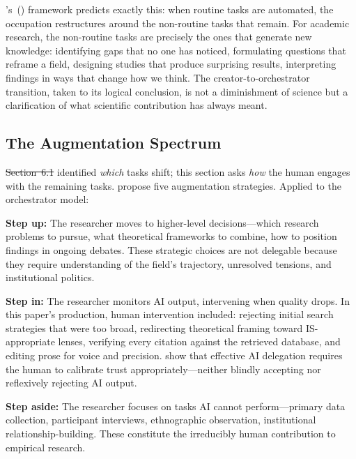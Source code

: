 \documentclass{article}
\providecommand{\DIFaddtex}[1]{{\protect\color{blue}\uwave{#1}}} %
\providecommand{\DIFdeltex}[1]{{\protect\color{red}\sout{#1}}}                      %
\providecommand{\DIFaddbegin}{} %
\providecommand{\DIFaddend}{} %
\providecommand{\DIFdelbegin}{} %
\providecommand{\DIFdelend}{} %
\providecommand{\DIFadd}[1]{\texorpdfstring{\DIFaddtex{#1}}{#1}} %
\providecommand{\DIFdel}[1]{\texorpdfstring{\DIFdeltex{#1}}{}} %
\newcommand{\DIFscaledelfig}{0.5}
\newlength{\DIFdelgraphicswidth} %
\newlength{\DIFdelgraphicsheight} %
\newcommand{\DIFaddincludegraphics}[2][]{{\color{blue}\fbox{\DIFOincludegraphics[#1]{#2}}}} %
\newcommand{\DIFdelincludegraphics}[2][]{%
\sbox{\DIFdelgraphicsbox}{\DIFOincludegraphics[#1]{#2}}%
\settoboxwidth{\DIFdelgraphicswidth}{\DIFdelgraphicsbox} %
\settoboxtotalheight{\DIFdelgraphicsheight}{\DIFdelgraphicsbox} %
\scalebox{\DIFscaledelfig}{%
\parbox[b]{\DIFdelgraphicswidth}{\usebox{\DIFdelgraphicsbox}\\[-\baselineskip] \rule{\DIFdelgraphicswidth}{0em}}\llap{\resizebox{\DIFdelgraphicswidth}{\DIFdelgraphicsheight}{%
\setlength{\unitlength}{\DIFdelgraphicswidth}%
\begin{picture}(1,1)%
\thicklines\linethickness{2pt} %
{\color[rgb]{1,0,0}\put(0,0){\framebox(1,1){}}}%
{\color[rgb]{1,0,0}\put(0,0){\line( 1,1){1}}}%
{\color[rgb]{1,0,0}\put(0,1){\line(1,-1){1}}}%
\end{picture}%
}\hspace*{3pt}}} %
} %
\DeclareRobustCommand{\DIFaddbegin}{\DIFOaddbegin \let\includegraphics\DIFaddincludegraphics} %
\DeclareRobustCommand{\DIFaddend}{\DIFOaddend \let\includegraphics\DIFOincludegraphics} %
\DeclareRobustCommand{\DIFdelbegin}{\DIFOdelbegin \let\includegraphics\DIFdelincludegraphics} %
\DeclareRobustCommand{\DIFdelend}{\DIFOaddend \let\includegraphics\DIFOincludegraphics} %
\begin{document}
\citeauthor{autor2015why}'s~(\citeyear{autor2015why}) framework predicts exactly this: when routine tasks are automated, the occupation restructures around the non-routine tasks that remain. For academic research, the non-routine tasks are precisely the ones that generate new knowledge: identifying gaps that no one has noticed, formulating questions that reframe a field, designing studies that produce surprising results, interpreting findings in ways that change how we think. The creator-to-orchestrator transition, taken to its logical conclusion, is not a diminishment of science but a clarification of what scientific contribution has always meant.

\subsection{The Augmentation Spectrum}

\DIFdelbegin \DIFdel{Section~6.1 }\DIFdelend %
\DIFaddbegin \DIFadd{Section~\ref{sec:task_redistribution} }\DIFaddend identified \textit{which} tasks shift; this section asks \textit{how} the human engages with the remaining tasks. \citet{davenport2016just} propose five augmentation strategies. Applied to the orchestrator model:

\textbf{Step up:} The researcher moves to higher-level decisions---which research problems to pursue, what theoretical frameworks to combine, how to position findings in ongoing debates. These strategic choices are not delegable because they require understanding of the field's trajectory, unresolved tensions, and institutional politics.

\textbf{Step in:} The researcher monitors AI output, intervening when quality drops. In this paper's production, human intervention included: rejecting initial search strategies that were too broad, redirecting theoretical framing toward IS-appropriate lenses, verifying every citation against the retrieved database, and editing prose for voice and precision. \citet{hemmer2023delegation} show that effective AI delegation requires the human to calibrate trust appropriately---neither blindly accepting nor reflexively rejecting AI output.

\textbf{Step aside:} The researcher focuses on tasks AI cannot perform---primary data collection, participant interviews, ethnographic observation, institutional relationship-building. These constitute the irreducibly human contribution to empirical research.
\end{document}
